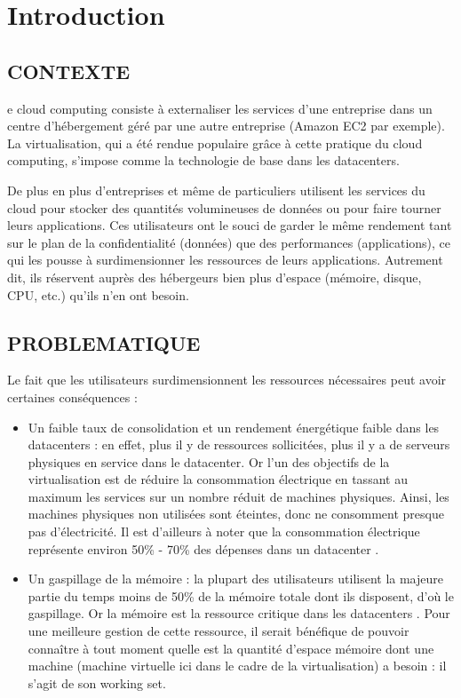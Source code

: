 %
%
\let\textcircled=\pgftextcircled
\chapter*{Introduction}
\label{chap:intro}
\section*{CONTEXTE}

e cloud computing consiste à externaliser les services d’une entreprise dans un centre d’hébergement géré par une autre entreprise (Amazon EC2 par exemple). La virtualisation, qui a été rendue populaire grâce à cette pratique du cloud computing, s'impose comme la technologie de base dans les datacenters.
\par\noindent De plus en plus d'entreprises et même de particuliers utilisent les services du cloud pour stocker des quantités volumineuses de données ou pour faire tourner leurs applications. Ces utilisateurs ont le souci de garder le même rendement tant sur le plan de la confidentialité (données) que des performances (applications), ce qui les pousse à surdimensionner les ressources de leurs applications. Autrement dit, ils réservent auprès des hébergeurs bien plus d'espace (mémoire, disque, CPU, etc.) qu'ils n'en ont besoin.

\section*{PROBLEMATIQUE}

Le fait que les utilisateurs surdimensionnent les ressources nécessaires peut avoir certaines conséquences :

\begin{itemize}[label=, font=\large \color{darkorange}]
    \item Un faible taux de consolidation et un rendement énergétique faible dans les datacenters :  en effet, plus il y de ressources sollicitées, plus il y a de serveurs physiques en service dans le datacenter. Or l'un des objectifs de la virtualisation est de réduire la consommation électrique en tassant au maximum les services sur un nombre réduit de machines physiques. Ainsi, les machines physiques non utilisées sont éteintes, donc ne consomment presque pas d’électricité. Il est d'ailleurs à noter que la consommation électrique représente environ 50\% - 70\% des dépenses dans un datacenter \cite{article1}.
    \item Un gaspillage de la mémoire : la plupart des utilisateurs utilisent la majeure partie du temps moins de 50\% de la mémoire totale dont ils disposent, d'où le gaspillage. Or la mémoire est la ressource critique dans les datacenters \cite{DBLP:conf/eurosys/NituVlad}. Pour une meilleure gestion de cette ressource, il serait bénéfique de pouvoir connaître à tout moment quelle est la quantité d'espace mémoire dont une machine (machine virtuelle ici dans le cadre de la virtualisation) a besoin : il s'agit de son working set.
\end{itemize}

